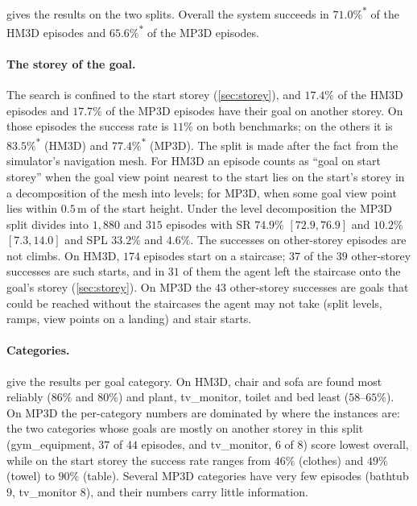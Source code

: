 \documentclass[10pt]{article}
\newcommand{\oldrev}{\textsuperscript{$\ast$}}
\newcommand{\m}{\,\mathrm{m}}
\begin{document}
 gives the results on the two splits. Overall the system
succeeds in $71.0\%$\oldrev{} of the HM3D episodes and $65.6\%$\oldrev{} of
the MP3D episodes.

\paragraph{The storey of the goal.} The search is confined to the start storey
(\cref{sec:storey}), and $17.4\%$ of the HM3D episodes and $17.7\%$ of the MP3D
episodes have their goal on another storey. On those episodes the success rate
is $11\%$ on both benchmarks; on the others it is $83.5\%$\oldrev{} (HM3D) and
$77.4\%$\oldrev{} (MP3D). The split is made after the fact from the simulator's navigation mesh.
For HM3D an episode counts as ``goal on start storey'' when the goal view
point nearest to the start lies on the start's storey in a decomposition of the
mesh into levels; for MP3D, when some goal view point lies within $0.5\m$ of
the start height. Under the level decomposition the MP3D split divides into
$1{,}880$ and $315$ episodes with SR $74.9\%$ $[72.9, 76.9]$ and $10.2\%$
$[7.3, 14.0]$ and SPL $33.2\%$ and $4.6\%$. The successes on other-storey
episodes are not climbs. On HM3D, $174$ episodes start on a staircase; $37$ of
the $39$ other-storey successes are such starts, and in $31$ of them the agent
left the staircase onto the goal's storey (\cref{sec:storey}). On MP3D the $43$
other-storey successes are goals that could be reached without the staircases
the agent may not take (split levels, ramps, view points on a landing) and
stair starts.

\paragraph{Categories.}  give the results per
goal category. On HM3D, chair and sofa are found most reliably ($86\%$ and
$80\%$) and plant, tv\_monitor, toilet and bed least ($58$--$65\%$). On MP3D
the per-category numbers are dominated by where the instances are: the two
categories whose goals are mostly on another storey in this split
(gym\_equipment, $37$ of $44$ episodes, and tv\_monitor, $6$ of $8$) score
lowest overall, while on the start storey the success rate ranges from $46\%$
(clothes) and $49\%$ (towel) to $90\%$ (table).
Several MP3D categories have very few episodes (bathtub $9$, tv\_monitor $8$),
and their numbers carry little information.
\end{document}
